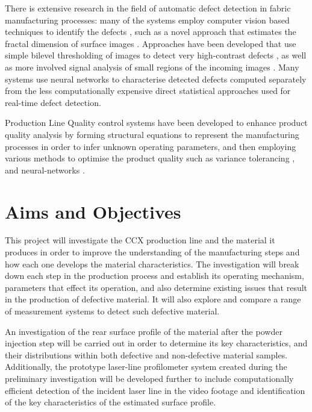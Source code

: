 \documentclass[12pt]{report}
\begin{document}
        There is extensive research in the field of automatic defect detection in fabric manufacturing processes: many of the systems employ computer vision based techniques to identify the defects \cite{kumar2008computer}, such as a novel approach that estimates the fractal dimension of surface images \cite{conci1998fractal}. Approaches have been developed that use simple bilevel thresholding of images to detect very high-contrast defects \cite{stojanovic2001real}\cite{norton1993machine}, as well as more involved signal analysis of small regions of the incoming images \cite{zhang1995fabric}\cite{huart1994integration}\cite{abou2008line}. Many systems use neural networks to characterise detected defects \cite{stojanovic2001real}\cite{wong2009stitching}\cite{karayiannis1999defect} computed separately from the less computationally expensive direct statistical approaches used for real-time defect detection.
        
        Production Line Quality control systems have been developed to enhance product quality analysis by forming structural equations to represent the manufacturing processes in order to infer unknown operating parameters, and then employing various methods to optimise the product quality such as variance tolerancing \cite{suh2007dynamic},\cite{koo2001variance} and neural-networks \cite{ohshima2000quality}.
        
    \section{Aims and Objectives}
        This project will investigate the CCX production line and the material it produces in order to improve the understanding of the manufacturing steps and how each one develops the material characteristics. The investigation will break down each step in the production process and establish its operating mechanism, parameters that effect its operation, and also determine existing issues that result in the production of defective material. It will also explore and compare a range of measurement systems to detect such defective material.
        
        An investigation of the rear surface profile of the material after the powder injection step will be carried out in order to determine its key characteristics, and their distributions within both defective and non-defective material samples. Additionally, the prototype laser-line profilometer system created during the preliminary investigation will be developed further to include computationally efficient detection of the incident laser line in the video footage and identification of the key characteristics of the estimated surface profile.
        
\end{document}
